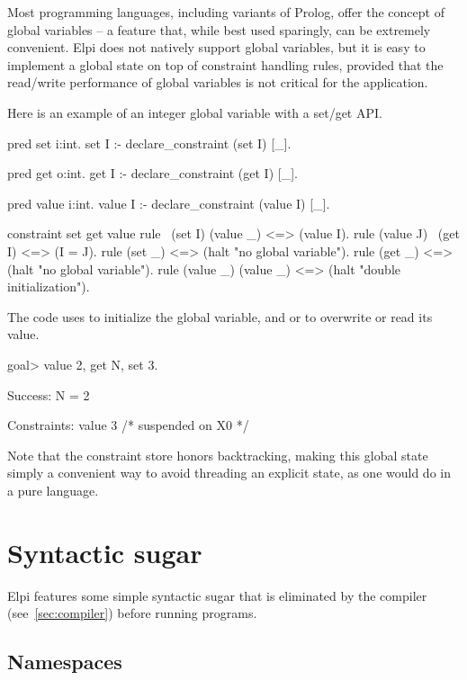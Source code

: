 \documentclass{these-ISSS}
\newenvironment{elpicode}
  {\VerbatimEnvironment\begin{elpibox}\begin{xelpicode}}{\end{xelpicode}
\end{elpibox}}
\newenvironment{elpioutput}
  {\VerbatimEnvironment\begin{outputbox}\begin{xelpicode}}{\end{xelpicode}
\end{outputbox}}
\begin{document}
Most programming languages, including variants of Prolog, offer the concept of
global variables -- a feature that, while best used sparingly, can be extremely
convenient. Elpi does not natively support global variables, but it is easy to
implement a global state on top of constraint handling rules, provided that the
read/write performance of global variables is not critical for the application.


Here is an example of an integer global variable with a set/get API.

\begin{elpicode}
pred set i:int.
set I :- declare_constraint (set I) [_].

pred get o:int.
get I :- declare_constraint (get I) [_].

pred value i:int.
value I :- declare_constraint (value I) [_].

constraint set get value {
  rule \ (set I) (value _)   <=> (value I).           
  rule (value J) \ (get I)   <=> (I = J).      
  rule (set _)               <=> (halt "no global variable").
  rule (get _)               <=> (halt "no global variable").
  rule (value _) (value _)   <=> (halt "double initialization").
}
\end{elpicode}

The code uses  to initialize the global variable, and
 or  to overwrite or read its value.

\begin{elpioutput}
goal> value 2, get N, set 3.

Success:
  N = 2

Constraints:
 value 3  /* suspended on X0 */
\end{elpioutput}

Note that the constraint store honors backtracking, making this global state
simply a convenient way to avoid threading an explicit state, as one would do
in a pure language.

\newpage
\section{Syntactic sugar}


Elpi features some simple syntactic sugar that is eliminated by the compiler (see~\cref{sec:compiler})
before running programs.

\subsection{Namespaces}
\end{document}
